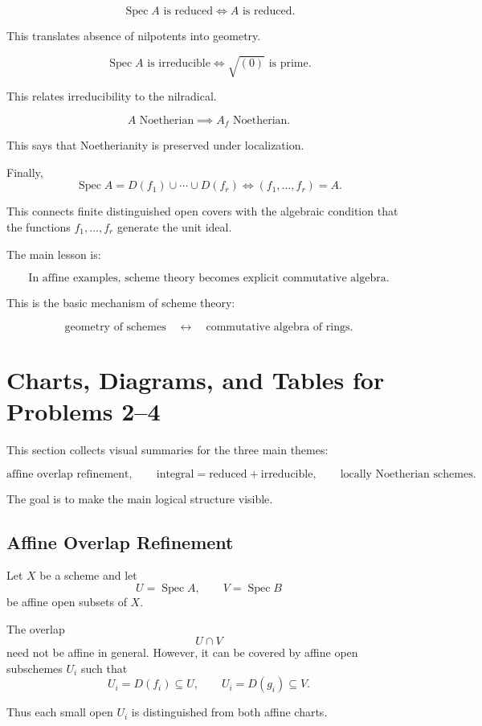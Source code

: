 \documentclass[12pt,a4paper]{article}
\DeclareMathOperator{\Spec}{Spec}
\providecommand{\Spec}{\operatorname{Spec}}
\theoremstyle{notespace}
\begin{document}
\[
\Spec A\text{ is reduced}
\iff
A\text{ is reduced}.
\]

This translates absence of nilpotents into geometry.

\[
\Spec A\text{ is irreducible}
\iff
\sqrt{(0)}\text{ is prime}.
\]

This relates irreducibility to the nilradical.

\[
A\text{ Noetherian}
\implies
A_f\text{ Noetherian}.
\]

This says that Noetherianity is preserved under localization.

Finally,
\[
\Spec A=D(f_1)\cup\cdots\cup D(f_r)
\iff
(f_1,\dots,f_r)=A.
\]

This connects finite distinguished open covers with the algebraic condition that the functions \(f_1,\dots,f_r\) generate the unit ideal.

The main lesson is:

\[
\boxed{
	\text{In affine examples, scheme theory becomes explicit commutative algebra.}
}
\]

This is the basic mechanism of scheme theory:

\[
\text{geometry of schemes}
\quad\longleftrightarrow\quad
\text{commutative algebra of rings}.
\]


\section{Charts, Diagrams, and Tables for Problems 2--4}

This section collects visual summaries for the three main themes:

\[
\text{affine overlap refinement},
\qquad
\text{integral}=\text{reduced}+\text{irreducible},
\qquad
\text{locally Noetherian schemes}.
\]

The goal is to make the main logical structure visible.

\subsection{Affine Overlap Refinement}

Let \(X\) be a scheme and let
\[
U=\Spec A,
\qquad
V=\Spec B
\]
be affine open subsets of \(X\).

The overlap
\[
U\cap V
\]
need not be affine in general. However, it can be covered by affine open subschemes \(U_i\) such that
\[
U_i=D(f_i)\subseteq U,
\qquad
U_i=D(g_i)\subseteq V.
\]

Thus each small open \(U_i\) is distinguished from both affine charts.
\end{document}
